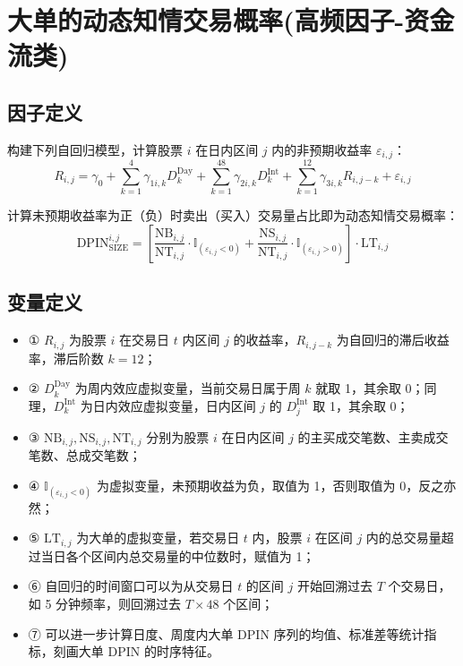 \documentclass{article}
\begin{document}
\section{大单的动态知情交易概率(高频因子-资金流类)}

\subsection{因子定义}

构建下列自回归模型，计算股票 \( i \) 在日内区间 \( j \) 内的非预期收益率 \( \varepsilon_{i,j} \)：
\begin{equation}
    R_{i,j} = \gamma_0 + \sum_{k=1}^{4} \gamma_{1i,k} D_k^{\mathrm{Day}} + \sum_{k=1}^{48} \gamma_{2i,k} D_k^{\mathrm{Int}} + \sum_{k=1}^{12} \gamma_{3i,k} R_{i,j-k} + \varepsilon_{i,j}
\end{equation}

计算未预期收益率为正（负）时卖出（买入）交易量占比即为动态知情交易概率：
\begin{equation}
    \mathrm{DPIN}_{\mathrm{SIZE}}^{i,j} = \left[ \frac{\mathrm{NB}_{i,j}}{\mathrm{NT}_{i,j}} \cdot \mathbb{I}_{(\varepsilon_{i,j} < 0)} + \frac{\mathrm{NS}_{i,j}}{\mathrm{NT}_{i,j}} \cdot \mathbb{I}_{(\varepsilon_{i,j} > 0)} \right] \cdot \mathrm{LT}_{i,j}
\end{equation}

\subsection{变量定义}
\begin{itemize}
    \item ① \( R_{i,j} \) 为股票 \( i \) 在交易日 \( t \) 内区间 \( j \) 的收益率，\( R_{i,j-k} \) 为自回归的滞后收益率，滞后阶数 \( k=12 \)；
    \item ② \( D_k^{\mathrm{Day}} \) 为周内效应虚拟变量，当前交易日属于周 \( k \) 就取 1，其余取 0；同理，\( D_k^{\mathrm{Int}} \) 为日内效应虚拟变量，日内区间 \( j \) 的 \( D_j^{\mathrm{Int}} \) 取 1，其余取 0；
    \item ③ \( \mathrm{NB}_{i,j}, \mathrm{NS}_{i,j}, \mathrm{NT}_{i,j} \) 分别为股票 \( i \) 在日内区间 \( j \) 的主买成交笔数、主卖成交笔数、总成交笔数；
    \item ④ \( \mathbb{I}_{(\varepsilon_{i,j} < 0)} \) 为虚拟变量，未预期收益为负，取值为 1，否则取值为 0，反之亦然；
    \item ⑤ \( \mathrm{LT}_{i,j} \) 为大单的虚拟变量，若交易日 \( t \) 内，股票 \( i \) 在区间 \( j \) 内的总交易量超过当日各个区间内总交易量的中位数时，赋值为 1；
    \item ⑥ 自回归的时间窗口可以为从交易日 \( t \) 的区间 \( j \) 开始回溯过去 \( T \) 个交易日，如 5 分钟频率，则回溯过去 \( T \times 48 \) 个区间；
    \item ⑦ 可以进一步计算日度、周度内大单 DPIN 序列的均值、标准差等统计指标，刻画大单 DPIN 的时序特征。
\end{itemize}
\end{document}
